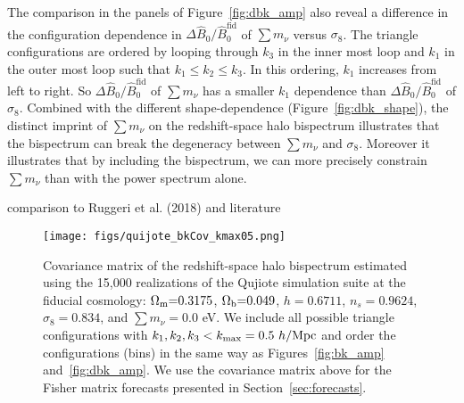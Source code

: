 \documentclass[12pt, letterpaper, preprint]{aastex62}
\newcommand{\Om}{\Omega_{\rm m}}
\newcommand{\Ob}{\Omega_{\rm b}}
\newcommand{\smnu}{\sum m_\nu}
\newcommand{\sig}{\sigma_8}
\newcommand{\BOk}{\widehat{B}_0}
\newcommand{\ch}[1]{{\color{orange}{\bf CH:} #1}}
\begin{document}
The comparison in the panels of Figure~\ref{fig:dbk_amp} also reveal a difference 
in the configuration dependence in $\Delta \BOk/\BOk^\mathrm{fid}$ of $\smnu$ 
versus $\sig$. The triangle configurations are ordered by looping through $k_3$ 
in the inner most loop and $k_1$ in the outer most loop such that $k_1 \leq k_2 \leq k_3$. 
In this ordering, $k_1$ increases from left to right. So $\Delta \BOk/\BOk^\mathrm{fid}$ 
of $\smnu$  has a smaller $k_1$ dependence than $\Delta \BOk/\BOk^\mathrm{fid}$ of 
$\sig$. Combined with the different shape-dependence (Figure~\ref{fig:dbk_shape}), 
the distinct imprint of $\smnu$ on the redshift-space halo bispectrum illustrates 
that the bispectrum can break the degeneracy between $\smnu$ and $\sig$. Moreover
it illustrates that by including the bispectrum, we can more precisely constrain 
$\smnu$ than with the power spectrum alone. 

\ch{comparison to Ruggeri et al. (2018) and literature} 

\begin{figure}
\begin{center}
    \texttt{[image: figs/quijote\_bkCov\_kmax05.png]} 
    \caption{Covariance matrix of the redshift-space halo bispectrum estimated 
    using the 15,000 realizations of the Qujiote simulation suite at the fiducial 
    cosmology: $\Om{=}0.3175$, $\Ob{=}0.049$, $h{=}0.6711$, $n_s{=}0.9624$, $\sig{=}0.834$, 
    and $\smnu{=}0.0$ eV. We include all possible triangle configurations with 
    $k_1, k_2, k_3 < k_{\rm max} = 0.5~h/{\rm Mpc}$ and order the configurations 
    (bins) in the same way as Figures~\ref{fig:bk_amp} and~\ref{fig:dbk_amp}. We 
    use the covariance matrix above for the Fisher matrix forecasts presented in 
    Section~\ref{sec:forecasts}. 
    }
\label{fig:bk_cov}
\end{center}
\end{figure}
\end{document}
